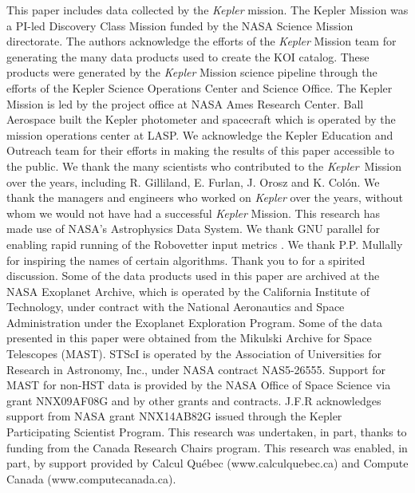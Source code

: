 \documentclass[twocolumn,tighten,trackchanges]{aastex61}
\renewcommand{\_}{\discretionary{\underscore}{}{\underscore}}  %
\newcommand\Kepler{\textit{Kepler}}
\begin{document}











\acknowledgments

This paper includes data collected by the \Kepler{} mission. The Kepler Mission was a PI-led Discovery Class Mission funded by the NASA Science Mission directorate. The authors acknowledge the efforts of the \Kepler{} Mission team for generating the many data products used to create the KOI catalog. These products were generated by the \Kepler{} Mission science pipeline through the efforts of the Kepler Science Operations Center and Science Office. The Kepler Mission is led by the project office at NASA Ames Research Center. Ball Aerospace built the Kepler photometer and spacecraft which is operated by the mission operations center at LASP.  
We acknowledge the Kepler Education and Outreach team for their efforts in making the results of this paper accessible to the public. We thank the many scientists who contributed to the \Kepler\ Mission over the years, including R. Gilliland, E. Furlan, J. Orosz and K. Col\'{o}n. We thank the managers and engineers who worked on \Kepler{} over the years, without whom we would not have had a successful \Kepler{} Mission. This research has made use of NASA's Astrophysics Data System. We thank GNU parallel for enabling rapid running of the Robovetter input metrics \citep{Tange2011a}. We thank P.P. Mullally for inspiring the names of certain algorithms. Thank you to \citet{Turbo-King2017} for a spirited discussion.
Some of the data products used in this paper are archived at the NASA Exoplanet Archive, which is operated by the California Institute of Technology, under contract with the National Aeronautics and Space Administration under the Exoplanet Exploration Program. Some of the data presented in this paper were obtained from the Mikulski Archive for Space Telescopes (MAST). STScI is operated by the Association of Universities for Research in Astronomy, Inc., under NASA contract NAS5-26555. Support for MAST for non-HST data is provided by the NASA Office of Space Science via grant NNX09AF08G and by other grants and contracts.  J.F.R acknowledges support from NASA grant NNX14AB82G issued through the Kepler Participating Scientist Program. This research was undertaken, in part, thanks to funding from the Canada Research Chairs program. This research was enabled, in part, by support provided by Calcul Qu\'{e}bec (www.calculquebec.ca) and Compute Canada (www.computecanada.ca). 
\end{document}
